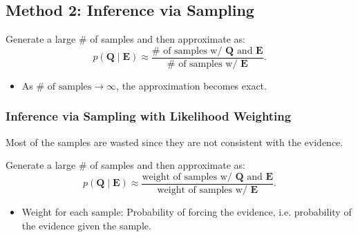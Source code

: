 \subsection{Method 2: Inference via Sampling}
\begin{definition}
    Generate a large \# of samples and then approximate as:
    \[
    p(\mathbf{Q} \mid \mathbf{E}) \approx \frac{\# \text{ of samples w/ } \mathbf{Q} \text{ and } \mathbf{E}}{\# \text{ of samples w/ } \mathbf{E}}.
    \]
    \begin{itemize}
        \item As $\# \text{ of samples} \to \infty$, the approximation becomes exact.
    \end{itemize}
\end{definition}

\subsubsection{Inference via Sampling with Likelihood Weighting}
\begin{motivation}
    Most of the samples are wasted since they are not consistent with the evidence.
\end{motivation}

\begin{definition}
    Generate a large \# of samples and then approximate as:
    \[
    p(\mathbf{Q} \mid \mathbf{E}) \approx \frac{\text{weight of samples w/ } \mathbf{Q} \text{ and } \mathbf{E}}{\text{weight of samples w/ } \mathbf{E}}.
    \]
    \begin{itemize}
        \item Weight for each sample: Probability of forcing the evidence, i.e. probability of the evidence given the sample.
    \end{itemize}
\end{definition}
\newpage

